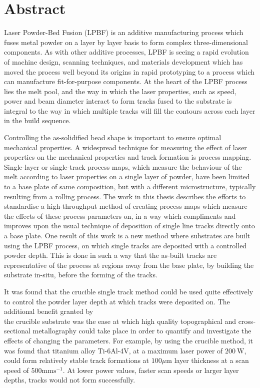 \documentclass[10pt]{article}
\begin{document}
\section*{Abstract}
Laser Powder-Bed Fusion (LPBF) is an additive manufacturing process which fuses metal powder on a layer by layer basis to form complex three-dimensional components. As with other additive processes, LPBF is seeing a rapid evolution of machine design, scanning techniques, and materials development which has moved the process well beyond its origins in rapid prototyping to a process which can manufacture fit-for-purpose components. At the heart of the LPBF process lies the melt pool, and the way in which the laser properties, such as speed, power and beam diameter interact to form tracks fused to the substrate is integral to the way in which multiple tracks will fill the contours across each layer in the build sequence.

Controlling the as-solidified bead shape is important to ensure optimal mechanical properties. A widespread technique for measuring the effect of laser properties on the mechanical properties and track formation is process mapping. Single-layer or single-track process maps, which measure the behaviour of the melt according to laser properties on a single layer of powder, have been limited to a base plate of same composition, but with a different microstructure, typically resulting from a rolling process. The work in this thesis describes the efforts to standardise a high-throughput method of creating process maps which measure the effects of these process parameters on, in a way which compliments and improves upon the usual technique of deposition of single line tracks directly onto a base plate. One result of this work is a new method where substrates are built using the LPBF process, on which single tracks are deposited with a controlled powder depth. This is done in such a way that the as-built tracks are representative of the process at regions away from the base plate, by building the substrate in-situ, before the forming of the tracks.

It was found that the crucible single track method could be used quite effectively to control the powder layer depth at which tracks were deposited on. The additional benefit granted by\\
the crucible substrate was the ease at which high quality topographical and cross-sectional metallography could take place in order to quantify and investigate the effects of changing the parameters. For example, by using the crucible method, it was found that titanium alloy Ti-6Al-4V, at a maximum laser power of $200 \mathrm{~W}$, could form relatively stable track formations at $100 \mu \mathrm{m}$ layer thickness at a scan speed of $500 \mathrm{mms}^{-1}$. At lower power values, faster scan speeds or larger layer depths, tracks would not form successfully.
\end{document}
